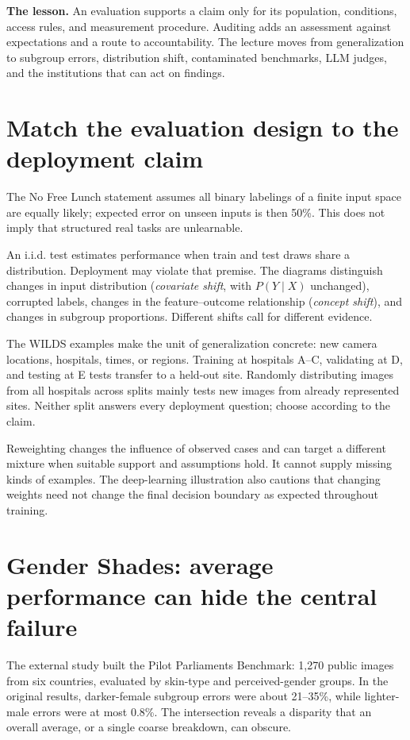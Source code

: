 \documentclass[11pt,letterpaper]{article}
\begin{document}

\textbf{The lesson.} An evaluation supports a claim only for its population,
conditions, access rules, and measurement procedure. Auditing adds an assessment
against expectations and a route to accountability. The lecture moves from
generalization to subgroup errors, distribution shift, contaminated benchmarks,
LLM judges, and the institutions that can act on findings.

\section*{Match the evaluation design to the deployment claim}
The No Free Lunch statement assumes all binary labelings
of a finite input space are equally likely; expected error on unseen inputs is
then 50\%. This does not imply that structured real tasks are unlearnable.

An i.i.d. test estimates performance when train and test draws share a distribution.
Deployment may violate that premise. The diagrams distinguish changes in input
distribution (\emph{covariate shift}, with $P(Y\mid X)$ unchanged), corrupted
labels, changes in the feature--outcome relationship (\emph{concept shift}), and
changes in subgroup proportions. Different shifts call for different evidence.

The WILDS examples make the unit of generalization concrete: new camera locations,
hospitals, times, or regions. Training at hospitals A--C, validating at D, and
testing at E tests transfer to a held-out site. Randomly distributing images from
all hospitals across splits mainly tests new images from already represented sites.
Neither split answers every deployment question; choose according to the claim.

Reweighting changes the influence of observed cases and can target a different
mixture when suitable support and assumptions hold. It cannot supply missing kinds
of examples. The deep-learning illustration also cautions that changing weights
need not change the final decision boundary as expected throughout training.

\section*{Gender Shades: average performance can hide the central failure}
The external study built the Pilot Parliaments Benchmark: 1,270 public images from
six countries, evaluated by skin-type and perceived-gender groups. In the original
results, darker-female subgroup errors were about 21--35\%, while lighter-male
errors were at most 0.8\%. The intersection reveals a disparity that an overall
average, or a single coarse breakdown, can obscure.
\end{document}
